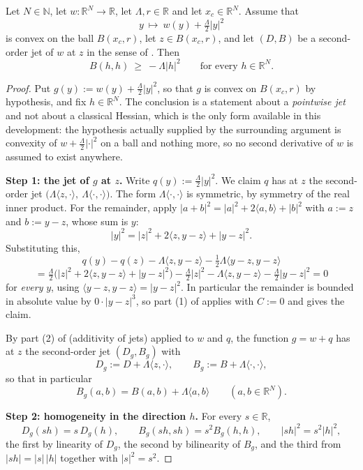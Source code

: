 \begin{lemma}
Let $N\in\mathbb N$, let $w:\mathbb R^{N}\to\mathbb R$, let $\Lambda,r\in\mathbb R$ and let
$x_c\in\mathbb R^{N}$. Assume that
\[
 y\ \longmapsto\ w(y)+\tfrac\Lambda2|y|^{2}
\]
is convex on the ball $B(x_c,r)$, let $z\in B(x_c,r)$, and let $(D,B)$ be a second-order jet
of $w$ at $z$ in the sense of . Then
\[
 B(h,h)\ \ge\ -\Lambda|h|^{2}\qquad\text{for every }h\in\mathbb R^{N}.
\]
\end{lemma}
\begin{proof}
Put $g(y):=w(y)+\frac\Lambda2|y|^{2}$, so that $g$ is convex on $B(x_c,r)$ by hypothesis,
and fix $h\in\mathbb R^{N}$. The conclusion is a statement about a \emph{pointwise jet} and
not about a classical Hessian, which is the only form available in this development: the
hypothesis actually supplied by the surrounding argument is convexity of
$w+\frac\Lambda2|\cdot|^{2}$ on a ball and nothing more, so no second derivative of $w$ is
assumed to exist anywhere.

\medskip\noindent\textbf{Step 1: the jet of $g$ at $z$.} Write $q(y):=\frac\Lambda2|y|^{2}$.
We claim $q$ has at $z$ the second-order jet $\big(\Lambda\langle z,\cdot\rangle,\
\Lambda\langle\cdot,\cdot\rangle\big)$. The form $\Lambda\langle\cdot,\cdot\rangle$ is
symmetric, by symmetry of the real inner product. For the remainder, apply
$|a+b|^{2}=|a|^{2}+2\langle a,b\rangle+|b|^{2}$ with $a:=z$ and $b:=y-z$, whose sum is $y$:
\[
 |y|^{2}=|z|^{2}+2\langle z,y-z\rangle+|y-z|^{2} .
\]
Substituting this,
\[
 q(y)-q(z)-\Lambda\langle z,y-z\rangle-\tfrac12\Lambda\langle y-z,y-z\rangle
\]
\[
 =\tfrac\Lambda2\Big(|z|^{2}+2\langle z,y-z\rangle+|y-z|^{2}\Big)-\tfrac\Lambda2|z|^{2}
   -\Lambda\langle z,y-z\rangle-\tfrac\Lambda2|y-z|^{2}=0
\]
for \emph{every} $y$, using $\langle y-z,y-z\rangle=|y-z|^{2}$. In particular the remainder
is bounded in absolute value by $0\cdot|y-z|^{3}$, so part (1) of
\noderef{SecondOrderJetCalculus} applies with $C:=0$ and gives the claim.

By part (2) of  (additivity of jets) applied to $w$ and $q$,
the function $g=w+q$ has at $z$ the second-order jet $(D_g,B_g)$ with
\[
 D_g:=D+\Lambda\langle z,\cdot\rangle,\qquad
 B_g:=B+\Lambda\langle\cdot,\cdot\rangle ,
\]
so that in particular
\[
 B_g(a,b)=B(a,b)+\Lambda\langle a,b\rangle\qquad(a,b\in\mathbb R^{N}). \tag{1}
\]

\medskip\noindent\textbf{Step 2: homogeneity in the direction $h$.} For every
$s\in\mathbb R$,
\[
 D_g(s h)=s\,D_g(h),\qquad B_g(s h,s h)=s^{2}B_g(h,h),\qquad |s h|^{2}=s^{2}|h|^{2},
\]
the first by linearity of $D_g$, the second by bilinearity of $B_g$, and the third from
$|s h|=|s|\,|h|$ together with $|s|^{2}=s^{2}$.


\end{proof}
